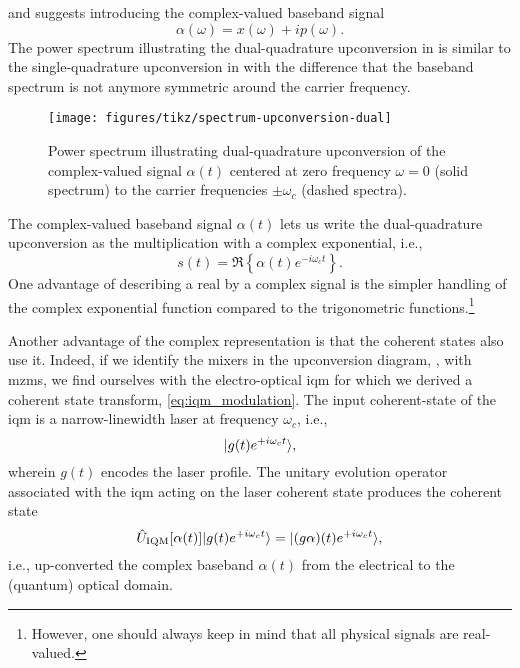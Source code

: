 and suggests introducing the complex-valued baseband signal
\begin{equation}
	\alpha(\omega)
	=
	x(\omega)
	+
	ip(\omega)
	.
\end{equation}
The power spectrum illustrating the dual-quadrature upconversion in  is similar to the single-quadrature upconversion in  with the difference that the baseband spectrum is not anymore symmetric around the carrier frequency.
\begin{figure}[htb]
	\centering
	\texttt{[image: figures/tikz/spectrum-upconversion-dual]}
	\caption{Power spectrum illustrating dual-quadrature upconversion of the complex-valued signal $\alpha(t)$ centered at zero frequency $\omega=0$ (solid spectrum) to the carrier frequencies $\pm\omega_c$ (dashed spectra).}\label{fig:spectrum_upconversion_dual}
\end{figure}
The complex-valued baseband signal $\alpha(t)$ lets us write the dual-quadrature upconversion as the multiplication with a complex exponential, i.e.,
\begin{equation}
	s(t)
	=
	\Re\left\{
		\alpha(t)
		e^{-i\omega_ct}
	\right\}
	.
	\label{eq:real_complex_passband}
\end{equation}
One advantage of describing a real by a complex signal is the simpler handling of the complex exponential function compared to the trigonometric functions.\footnote{However, one should always keep in mind that all physical signals are real-valued.}

Another advantage of the complex representation is that the coherent states also use it.
Indeed, if we identify the mixers in the upconversion diagram, , with \glspl{mzm}, we find ourselves with the electro-optical \gls{iqm} for which we derived a coherent state transform, \cref{eq:iqm_modulation}.
The input coherent-state of the \gls{iqm} is a narrow-linewidth laser at frequency $\omega_c$, i.e.,
\begin{equation}
	\lvert g(t)e^{+i\omega_ct}\rangle
	,
\end{equation}
wherein $g(t)$ encodes the laser profile.
The unitary evolution operator associated with the \gls{iqm} acting on the laser coherent state produces the coherent state
\begin{equation}
	\hat{U}_\text{IQM}[\alpha(t)]
	\lvert g(t)e^{+i\omega_ct}\rangle
	=
	\lvert(g\alpha)(t)e^{+i\omega_ct}\rangle
	,
\end{equation}
i.e., up-converted the complex baseband $\alpha(t)$ from the electrical to the (quantum) optical domain.